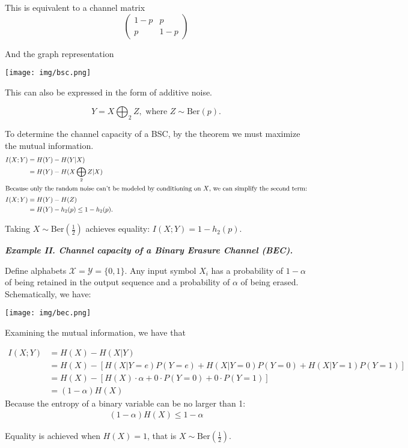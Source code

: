 \documentclass[12pt]{extarticle}
\newcommand{\eq}[1]{\begin{align*}#1\end{align*}}
\begin{document}
This is equivalent to a channel matrix
\[
\begin{pmatrix}
1-p & p \\
p & 1 - p
\end{pmatrix}
\]

And the graph representation

\texttt{[image: img/bsc.png]}

This can also be expressed in the form of additive noise.

\[
Y = X \bigoplus_2 Z, \text{ where } Z \sim \text{Ber}(p).
\]

To determine the channel capacity of a BSC, by the theorem we must maximize the mutual information.
\begin{align*}
I(X; Y) &= H(Y) - H(Y|X) \\
		&= H(Y) - H(X \bigoplus_2 Z | X) \\
\intertext{Because only the random noise can't be modeled by conditioning on $X$, we can simplify the second term:}
I(X; Y) &= H(Y) - H(Z) \\
        &= H(Y) - h_2(p) \leq 1 - h_2(p).
\end{align*}

Taking $X \sim \text{Ber}(\frac{1}{2})$ achieves equality: $I(X; Y) = 1 - h_2(p)$.

\textbf{\textit{Example II. Channel capacity of a Binary Erasure Channel (BEC).}}

Define alphabets $\mathcal{X} = \mathcal{Y} = \{ 0, 1 \}$. Any input symbol $X_i$ has a probability of $1 - \alpha$ of being retained in the output sequence and a probability of $\alpha$ of being erased.  Schematically, we have:

\texttt{[image: img/bec.png]}

Examining the mutual information, we have that

\begin{align*}
I(X; Y) &= H(X) - H(X|Y) \\
		&= H(X) - [H(X | Y=e) P(Y=e) + H(X | Y=0) P(Y = 0) + H(X | Y=1) P(Y=1)] \\
        &= H(X) - [H(X) \cdot \alpha + 0 \cdot P(Y=0) + 0 \cdot P(Y=1)] \\
        &= (1 - \alpha) H(X)
\end{align*}
Because the entropy of a binary variable can be no larger than 1:
\eq{(1 - \alpha) H(X) \leq 1 - \alpha}

Equality is achieved when $H(X) = 1$, that is $X \sim \text{Ber}(\frac{1}{2})$.
\end{document}

